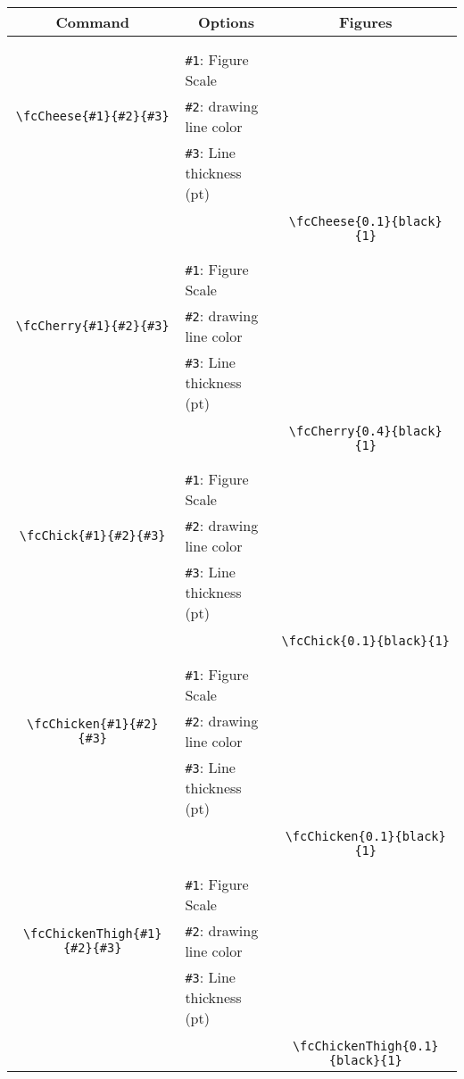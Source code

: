\documentclass[x11names]{article}
\begin{document}
\begin{table}[H]\centering\begin{tabular}{|c|l|c|}\hline {\bf Command}& \multicolumn{1}{c|}{{\bf Options}} & {\bf Figures}\\  \hline	&&\multirow{5}{*}{\fcCheese{0.1}{black}{1}}\\	&&\\	&\verb|#1|: Figure Scale &\\	\verb|\fcCheese{#1}{#2}{#3}|&	\verb|#2|: drawing line color &\\	&\verb|#3|: Line thickness (pt) &\\ &&\\&&	\verb|\fcCheese{0.1}{black}{1}|\\\hline 	
	&&\multirow{5}{*}{\fcCherry{0.4}{black}{1}}\\	&&\\	&\verb|#1|: Figure Scale &\\	\verb|\fcCherry{#1}{#2}{#3}|&	\verb|#2|: drawing line color &\\	&\verb|#3|: Line thickness (pt) &\\ &&\\&&	\verb|\fcCherry{0.4}{black}{1}|\\\hline 	
	&&\multirow{5}{*}{\fcChick{0.1}{black}{1}}\\	&&\\	&\verb|#1|: Figure Scale &\\	\verb|\fcChick{#1}{#2}{#3}|&	\verb|#2|: drawing line color &\\	&\verb|#3|: Line thickness (pt) &\\ &&\\&&	\verb|\fcChick{0.1}{black}{1}|\\\hline 	
	&&\multirow{5}{*}{\fcChicken{0.1}{black}{1}}\\	&&\\	&\verb|#1|: Figure Scale &\\	\verb|\fcChicken{#1}{#2}{#3}|&	\verb|#2|: drawing line color &\\	&\verb|#3|: Line thickness (pt) &\\ &&\\&&	\verb|\fcChicken{0.1}{black}{1}|\\\hline 	
	&&\multirow{5}{*}{\fcChickenThigh{0.1}{black}{1}}\\	&&\\	&\verb|#1|: Figure Scale &\\	\verb|\fcChickenThigh{#1}{#2}{#3}|&	\verb|#2|: drawing line color &\\	&\verb|#3|: Line thickness (pt) &\\ &&\\&&	\verb|\fcChickenThigh{0.1}{black}{1}|\\\hline 	

\end{tabular}
\end{table}
\end{document}
